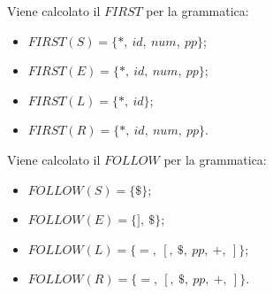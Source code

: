\documentclass[a4paper,italian]{article}
\begin{document}
Viene calcolato il $FIRST$ per la grammatica:
\begin{itemize}
	\item $FIRST(S)=\{*,\ id,\ num,\ pp\}$;
	\item $FIRST(E)=\{*,\ id,\ num,\ pp\}$;
	\item $FIRST(L)=\{*,\ id\}$;
	\item $FIRST(R)=\{*,\ id,\ num,\ pp\}$.
\end{itemize}

Viene calcolato il $FOLLOW$ per la grammatica:
\begin{itemize}
	\item $FOLLOW(S)=\{\$\}$;
	\item $FOLLOW(E)=\{],\ \$\}$;
	\item $FOLLOW(L)=\{=,\ [,\ \$,\ pp,\ +,\ ]\}$;
	\item $FOLLOW(R)=\{=,\ [,\ \$,\ pp,\ +,\ ]\}$.
\end{itemize}
\end{document}
